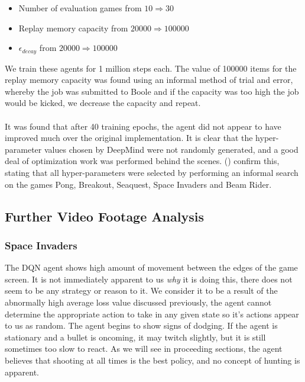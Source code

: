 \begin{itemize}
	\item Number of evaluation games from $10 \Rightarrow 30$
	\item Replay memory capacity from $20000 \Rightarrow 100000$
	\item $\epsilon_{decay}$ from $20000 \Rightarrow 100000$
\end{itemize}

We train these agents for 1 million steps each. The value of 100000 items for the replay memory capacity was found using an informal method of trial and error, whereby the job was submitted to Boole and if the capacity was too high the job would be kicked, we decrease the capacity and repeat. \paragraph{}

It was found that after 40 training epochs, the agent did not appear to have improved much over the original implementation. It is clear that the hyper-parameter values chosen by DeepMind were not randomly generated, and a good deal of optimization work was performed behind the scenes. (\citet{human}) confirm this, stating that all hyper-parameters were selected by performing an informal search on the games Pong, Breakout, Seaquest, Space Invaders and Beam Rider.

\subsection{Further Video Footage Analysis} \label{sec:video_analysis}
\subsubsection{Space Invaders}
The DQN agent shows high amount of movement between the edges of the game screen. It is not immediately apparent to us \textit{why} it is doing this, there does not seem to be any strategy or reason to it. We consider it to be a result of the abnormally high average loss value discussed previously, the agent cannot determine the appropriate action to take in any given state so it's actions appear to us as random. The agent begins to show signs of dodging. If the agent is stationary and a bullet is oncoming, it may twitch slightly, but it is still sometimes too slow to react. As we will see in proceeding sections, the agent believes that shooting at all times is the best policy, and no concept of hunting is apparent. \paragraph{}

